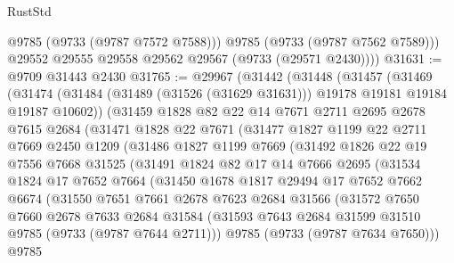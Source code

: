 \begin{lexlean}{RustStd}
\begin{coremodule}
{\begin{coremodule}
{{{{{{{{{{{{{{{{{{{{{{{{{{{{{{{{{{{{{{{{{{{{{{{{{{{{{{{            @9785
            (@9733 (@9787 @7572 @7588)))
          @9785
          (@9733 (@9787 @7562 @7589)))
        @29552
        @29555
        @29558
        @29562
        @29567
        (@9733 (@29571 @2430))))
@31631 := @9709 @31443 @2430
@31765 := @29967
    (@31442
      (@31448
        (@31457
          (@31469
            (@31474 (@31484 (@31489 (@31526 (@31629 @31631))) @19178 @19181 @19184 @19187 @10602))
            (@31459
              @1828
              @82
              @22
              @14
              @7671
              @2711
              @2695
              @2678
              @7615
              @2684
              (@31471
                @1828
                @22
                @7671
                (@31477
                  @1827
                  @1199
                  @22
                  @2711
                  @7669
                  @2450
                  @1209
                  (@31486
                    @1827
                    @1199
                    @7669
                    (@31492
                      @1826
                      @22
                      @19
                      @7556
                      @7668
                      @31525
                      (@31491
                        @1824
                        @82
                        @17
                        @14
                        @7666
                        @2695
                        (@31534
                          @1824
                          @17
                          @7652
                          @7664
                          (@31450
                            @1678
                            @1817
                            @29494
                            @17
                            @7652
                            @7662
                            @6674
                            (@31550
                              @7651
                              @7661
                              @2678
                              @7623
                              @2684
                              @31566
                              (@31572
                                @7650
                                @7660
                                @2678
                                @7633
                                @2684
                                @31584
                                (@31593 @7643 @2684 @31599 @31510 @9785 (@9733 (@9787 @7644 @2711)))
                                @9785
                                (@9733 (@9787 @7634 @7650)))
                              @9785
}}}}}}}}}}}}}}}}}}}}}}}}}}}}}}}}}}}}}}}}}}}}}}}}}}}}}}}
\end{coremodule}}
\end{coremodule}
\end{lexlean}
